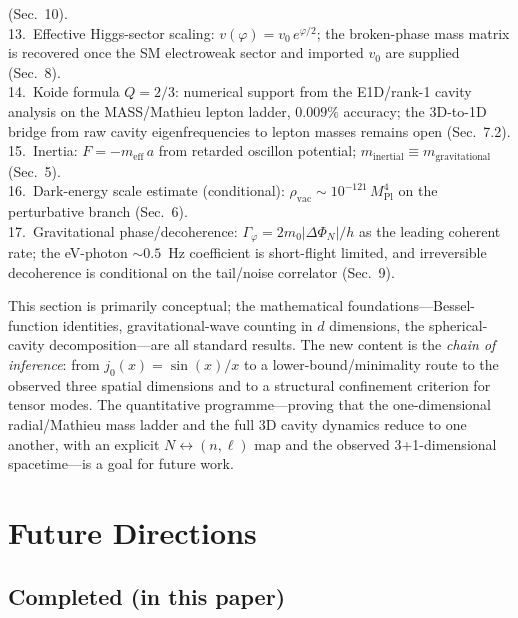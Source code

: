 \documentclass[11pt]{article}
\begin{document}
\begin{center}
{{(Sec.~10).\\[2pt]
13.\ Effective Higgs-sector scaling:
$v(\varphi) = v_0\,e^{\varphi/2}$; the broken-phase
mass matrix is recovered once the SM electroweak
sector and imported $v_0$ are supplied (Sec.~8).\\[2pt]
14.\ Koide formula $Q = 2/3$: numerical support
from the E1D/rank-1 cavity analysis on the MASS/Mathieu
lepton ladder, $0.009\%$ accuracy; the 3D-to-1D bridge
from raw cavity eigenfrequencies to lepton masses remains
open (Sec.~7.2).\\[2pt]
15.\ Inertia: $F = -m_{\mathrm{eff}}\,a$ from
retarded oscillon potential;
$m_{\mathrm{inertial}} \equiv
m_{\mathrm{gravitational}}$ (Sec.~5).\\[2pt]
16.\ Dark-energy scale estimate (conditional):
$\rho_{\mathrm{vac}} \sim 10^{-121}\,
M_{\mathrm{Pl}}^4$ on the perturbative branch
(Sec.~6).\\[2pt]
17.\ Gravitational phase/decoherence:
$\Gamma_{\varphi} = 2m_0|\Delta\Phi_N|/h$
as the leading coherent rate; the eV-photon
$\sim 0.5$~Hz coefficient is short-flight limited,
and irreversible decoherence is conditional on the
tail/noise correlator (Sec.~9).
}}
\end{center}

This section is primarily conceptual; the
mathematical foundations---Bessel-function
identities, gravitational-wave counting in
$d$ dimensions, the spherical-cavity
decomposition---are all standard results.
The new content is the \emph{chain of inference}:
from $j_0(x) = \sin(x)/x$ to a
lower-bound/minimality route to the observed
three spatial dimensions and to a structural
confinement criterion for tensor modes.  The
quantitative programme---proving that the
one-dimensional radial/Mathieu mass ladder and
the full 3D cavity dynamics reduce to one
another, with an explicit $N\leftrightarrow
(n,\ell)$ map and the observed 3+1-dimensional
spacetime---is a goal for future work.

\section{Future Directions}

\subsection*{Completed (in this paper)}
\end{document}
